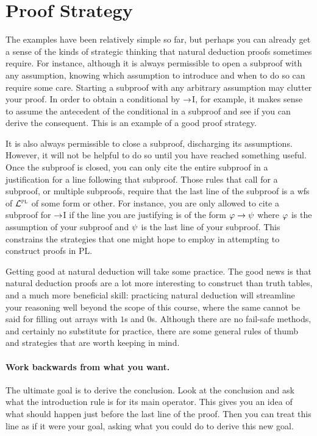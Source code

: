 \section{Proof Strategy}
  \label{sec.PL.Strategy}

The examples have been relatively simple so far, but perhaps you can already get a sense of the kinds of strategic thinking that natural deduction proofs sometimes require.
For instance, although it is always permissible to open a subproof with any assumption, knowing which assumption to introduce and when to do so can require some care.
Starting a subproof with any arbitrary assumption may clutter your proof.
In order to obtain a conditional by $\rightarrow$I, for example, it makes sense to assume the antecedent of the conditional in a subproof and see if you can derive the consequent.
This is an example of a good proof strategy.

It is also always permissible to close a subproof, discharging its assumptions.
However, it will not be helpful to do so until you have reached something useful.
Once the subproof is closed, you can only cite the entire subproof in a justification for a line following that subproof.
Those rules that call for a subproof, or multiple subproofs, require that the last line of the subproof is a wfs of $\mathcal{L}^{\textsc{pl}}$ of some form or other.
For instance, you are only allowed to cite a subproof for $\rightarrow$I if the line you are justifying is of the form $\varphi \rightarrow \psi$ where $\varphi$ is the assumption of your subproof and $\psi$ is the last line of your subproof.
This constrains the strategies that one might hope to employ in attempting to construct proofs in PL.

Getting good at natural deduction will take some practice.
The good news is that natural deduction proofs are a lot more interesting to construct than truth tables, and a much more beneficial skill: practicing natural deduction will streamline your reasoning well beyond the scope of this course, where the same cannot be said for filling out arrays with $1$s and $0$s.
Although there are no fail-safe methods, and certainly no substitute for practice, there are some general rules of thumb and strategies that are worth keeping in mind.


\paragraph{Work backwards from what you want.}
The ultimate goal is to derive the conclusion.
Look at the conclusion and ask what the introduction rule is for its main operator.
This gives you an idea of what should happen just before the last line of the proof.
Then you can treat this line as if it were your goal, asking what you could do to derive this new goal.

